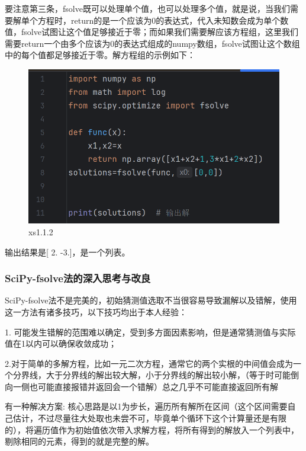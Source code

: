 \documentclass[12pt]{article}
\begin{document}
要注意第三条，fsolve既可以处理单个值，也可以处理多个值，就是说，当我们需要解单个方程时，return的是一个应该为0的表达式，代入未知数会成为单个数值，fsolve试图让这个值足够接近于零；而如果我们需要解应该方程组，这里我们需要return一个由多个应该为0的表达式组成的numpy数组，fsolve试图让这个数组中的每个值都足够接近于零。解方程组的示例如下：
\begin{figure}[H]
    \centering
    \includegraphics[width=0.75\linewidth]{解方程 program2.png}
    \caption{xs1.1.2}
    \label{fig:enter-label}
\end{figure}
输出结果是[ 2. -3.]，是一个列表。
\subsubsection{SciPy-fsolve法的深入思考与改良}
SciPy-fsolve法不是完美的，初始猜测值选取不当很容易导致漏解以及错解，使用这一方法有诸多技巧，以下技巧均出于本人经验：

1. 可能发生错解的范围难以确定，受到多方面因素影响，但是通常猜测值与实际值在1以内可以确保收敛成功；

2.对于简单的多解方程，比如一元二次方程，通常它的两个实根的中间值会成为一个分界线，大于分界线的解出较大解，小于分界线的解出较小解，（等于时可能倒向一侧也可能直接报错并返回会一个错解）总之几乎不可能直接返回所有解

有一种解决方案: 核心思路是以1为步长，遍历所有解所在区间（这个区间需要自己估计，不过尽量往大处取也未尝不可，毕竟单个循环下这个计算量还是有限的），将遍历值作为初始值依次带入求解方程，将所有得到的解放入一个列表中，剔除相同的元素，得到的就是完整的解。
\end{document}
